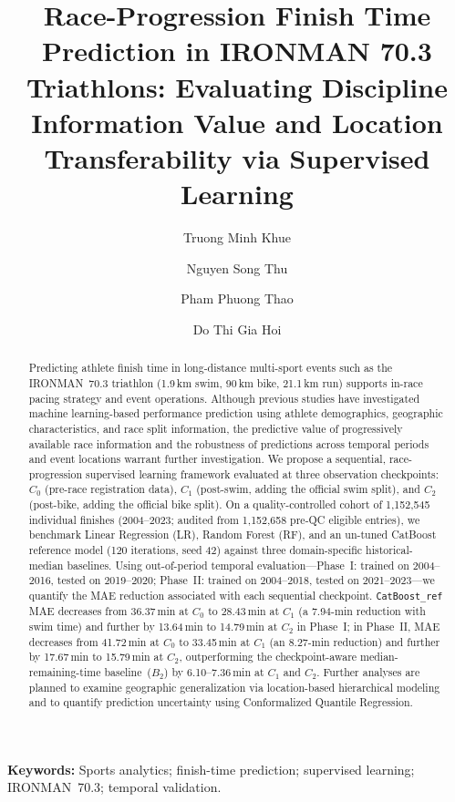 \documentclass[11pt,a4paper]{article}
\title{\textbf{Race-Progression Finish Time Prediction in IRONMAN 70.3
Triathlons: Evaluating Discipline Information Value and Location
Transferability via Supervised Learning}}
\author[1]{Truong Minh Khue}
\author[1]{Nguyen Song Thu}
\author[1]{Pham Phuong Thao}
\author[1]{Do Thi Gia Hoi}
\affil[1]{Department of Artificial Intelligence, FPT University
Da Nang, Vietnam}
\affil[ ]{\textit{fudaresearch@gmail.com}}
\date{}
\begin{document}
\maketitle

\begin{abstract}
Predicting athlete finish time in long-distance multi-sport events such
as the IRONMAN~70.3 triathlon (1.9\,km swim, 90\,km bike, 21.1\,km
run) supports in-race pacing strategy and event operations.
Although previous studies have investigated machine learning-based
performance prediction using athlete demographics, geographic
characteristics, and race split information, the predictive value of
progressively available race information and the robustness of
predictions across temporal periods and event locations warrant further
investigation.
We propose a sequential, race-progression supervised learning framework
evaluated at three observation checkpoints: $C_0$ (pre-race
registration data), $C_1$ (post-swim, adding the official swim split),
and $C_2$ (post-bike, adding the official bike split).
On a quality-controlled cohort of 1{,}152{,}545 individual finishes
(2004--2023; audited from 1{,}152{,}658 pre-QC eligible entries), we
benchmark Linear Regression (LR), Random Forest (RF), and an un-tuned
CatBoost reference model (120 iterations, seed 42) against three
domain-specific historical-median baselines.
Using out-of-period temporal evaluation---Phase~I: trained on
2004--2016, tested on 2019--2020; Phase~II: trained on 2004--2018,
tested on 2021--2023---we quantify the MAE reduction associated with
each sequential checkpoint.
\texttt{CatBoost\_ref} MAE decreases from 36.37\,min at $C_0$ to
28.43\,min at $C_1$ (a 7.94-min reduction with swim time) and further by
13.64\,min to 14.79\,min at $C_2$ in Phase~I; in Phase~II, MAE decreases
from 41.72\,min at $C_0$ to 33.45\,min at $C_1$ (an 8.27-min reduction)
and further by 17.67\,min to 15.79\,min at $C_2$, outperforming the
checkpoint-aware median-remaining-time baseline~($B_2$) by
6.10--7.36\,min at $C_1$ and $C_2$.
Further analyses are planned to examine geographic generalization via
location-based hierarchical modeling and to quantify prediction
uncertainty using Conformalized Quantile Regression.
\end{abstract}

\noindent\textbf{Keywords:} Sports analytics; finish-time prediction;
supervised learning; IRONMAN~70.3; temporal validation.
\end{document}
